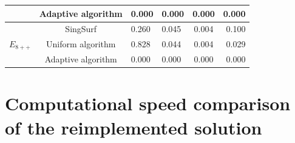 \begin{table}[ht]
\begin{center}
\begin{tabular}{|c|c|A B C D|}
                                        & Adaptive algorithm & 0.000 & 0.000 & 0.000 & 0.000\\
            \hline
            \hline 
             & SingSurf       & 0.260 & 0.045 & 0.004 & 0.100\\
                                        & Uniform algorithm & 0.828 & 0.044 & 0.004 & 0.029\\
                                        & Adaptive algorithm & 0.000 & 0.000 & 0.000 & 0.000\\
            \hline 
            \hline 
        \end{tabular}
    \end{center} 
\end{table}
\section{Computational speed comparison of the reimplemented solution}
\label{sub4.3}